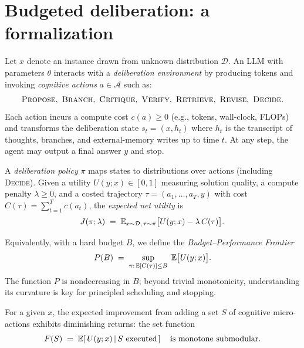 \section{Budgeted deliberation: a formalization}

Let $x$ denote an instance drawn from unknown distribution $\mathcal{D}$.
An LLM with parameters $\theta$ interacts with a \emph{deliberation environment} by producing tokens and invoking \emph{cognitive actions} $a \in \mathcal{A}$ such as:
\[
\textsc{Propose},\ \textsc{Branch},\ \textsc{Critique},\ \textsc{Verify},\ \textsc{Retrieve},\ \textsc{Revise},\ \textsc{Decide}.
\]
Each action incurs a compute cost $c(a) \ge 0$ (e.g., tokens, wall-clock, FLOPs) and transforms the deliberation state $s_t=(x,h_t)$ where $h_t$ is the transcript of thoughts, branches, and external-memory writes up to time $t$.
At any step, the agent may output a final answer $y$ and stop.

\begin{definition}
A \emph{deliberation policy} $\pi$ maps states to distributions over actions (including \textsc{Decide}).
Given a utility $U(y;x) \in [0,1]$ measuring solution quality, a compute penalty $\lambda \ge 0$, and a costed trajectory $\tau=(a_1,\dots,a_T,y)$ with cost $C(\tau)=\sum_{t=1}^T c(a_t)$, the \emph{expected net utility} is
\begin{equation}
J(\pi;\lambda) \;=\; \mathbb{E}_{x \sim \mathcal{D},\, \tau \sim \pi}\big[ U(y;x) - \lambda\, C(\tau) \big].
\label{eq:net-utility}
\end{equation}
\end{definition}

Equivalently, with a hard budget $B$, we define the \emph{Budget--Performance Frontier}
\begin{equation}
P(B) \;=\; \sup_{\pi:\, \mathbb{E}[C(\tau)] \le B} \; \mathbb{E}\big[ U(y;x) \big].
\label{eq:bpf}
\end{equation}
The function $P$ is nondecreasing in $B$; beyond trivial monotonicity, understanding its curvature is key for principled scheduling and stopping.

\begin{assumption}
\label{assump:dimret}
For a given $x$, the expected improvement from adding a set $S$ of cognitive micro-actions exhibits diminishing returns: the set function
\begin{equation}
\label{eq:Fsubmod}
F(S)\;=\;\mathbb{E}\!\left[\,U(y;x)\,\middle|\,S\text{ executed}\,\right]
\quad \text{is monotone submodular.}
\end{equation}
\end{assumption}

